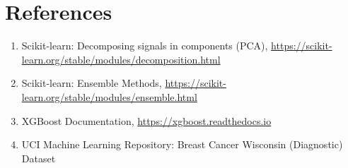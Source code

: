 \documentclass[12pt,a4paper]{article}
\begin{document}
\section{References}
\begin{enumerate}
\item Scikit-learn: Decomposing signals in components (PCA), \url{https://scikit-learn.org/stable/modules/decomposition.html}
\item Scikit-learn: Ensemble Methods, \url{https://scikit-learn.org/stable/modules/ensemble.html}
\item XGBoost Documentation, \url{https://xgboost.readthedocs.io}
\item UCI Machine Learning Repository: Breast Cancer Wisconsin (Diagnostic) Dataset
\end{enumerate}
\end{document}
